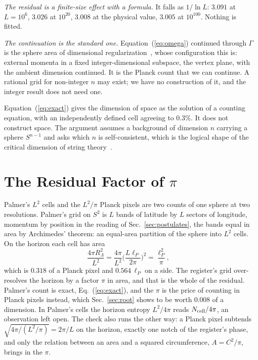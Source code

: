 \documentclass[aps,prd,twocolumn,superscriptaddress,nofootinbib]{revtex4-2}
\begin{document}
\textit{The residual is a finite-size effect with a formula.} It falls as $1/\ln L$: $3.091$ at $L = 10^{6}$, $3.026$ at $10^{20}$, $3.008$ at the physical value, $3.005$ at $10^{100}$. Nothing is fitted.

\textit{The continuation is the standard one.} Equation~(\ref{eq:omega}) continued through $\Gamma$ is the sphere area of dimensional regularization~\cite{thooft1972}, whose configuration this is: external momenta in a fixed integer-dimensional subspace, the vertex plane, with the ambient dimension continued. It is the Planck count that we can continue. A rational grid for non-integer $n$ may exist; we have no construction of it, and the integer result does not need one.

Equation~(\ref{eq:exact}) gives the dimension of space as the solution of a counting equation, with an independently defined cell agreeing to $0.3\%$. It does not construct space. The argument assumes a background of dimension $n$ carrying a sphere $S^{n-1}$ and asks which $n$ is self-consistent, which is the logical shape of the critical dimension of string theory~\cite{lovelace1971,goddard1972}.

\section{The Residual Factor of $\pi$}
\label{sec:pi}

Palmer's $L^2$ cells and the $L^2/\pi$ Planck pixels are two counts of one sphere at two resolutions. Palmer's grid on $S^2$ is $L$ bands of latitude by $L$ sectors of longitude, momentum by position in the reading of Sec.~\ref{sec:postulates}, the bands equal in area by Archimedes' theorem: an equal-area partition of the sphere into $L^2$ cells. On the horizon each cell has area
\begin{equation}
\frac{4\pi R_\Lambda^2}{L^2} = \frac{4\pi}{L^2}\Big(\frac{L\ell_P}{2\pi}\Big)^2 = \frac{\ell_P^2}{\pi},
\label{eq:cell}
\end{equation}
which is $0.318$ of a Planck pixel and $0.564\,\ell_P$ on a side. The register's grid over-resolves the horizon by a factor $\pi$ in area, and that is the whole of the residual. Palmer's count is exact, Eq.~(\ref{eq:exact}), and the $\pi$ is the price of counting in Planck pixels instead, which Sec.~\ref{sec:root} shows to be worth $0.008$ of a dimension. In Palmer's cells the horizon entropy $L^2/4\pi$ reads $N_{\rm cell}/4\pi$, an observation left open. The check also runs the other way: a Planck pixel subtends $\sqrt{4\pi/(L^2/\pi)} = 2\pi/L$ on the horizon, exactly one notch of the register's phase, and only the relation between an area and a squared circumference, $A = C^2/\pi$, brings in the $\pi$.
\end{document}
